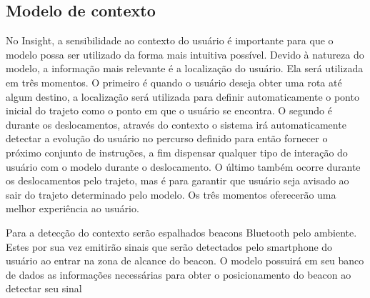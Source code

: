 \documentclass[english,brazilian]{UNISINOSmonografia}
\begin{document}

\subsection{Modelo de contexto}
No Insight, a sensibilidade ao contexto do usuário é importante para que o modelo possa ser utilizado da forma mais intuitiva possível. Devido à natureza do modelo, a informação mais relevante é a localização do usuário. Ela será utilizada em três momentos. O primeiro é quando o usuário deseja obter uma rota até algum destino, a localização será utilizada para definir automaticamente o ponto inicial do trajeto como o ponto em que o usuário se encontra. O segundo é durante os deslocamentos, através do contexto o sistema irá automaticamente detectar a evolução do usuário no percurso definido para então fornecer o próximo conjunto de instruções, a fim dispensar qualquer tipo de interação do usuário com o modelo durante o deslocamento. O último também ocorre durante os deslocamentos pelo trajeto, mas é para garantir que usuário seja avisado ao sair do trajeto determinado pelo modelo. Os três momentos oferecerão uma melhor experiência ao usuário.

Para a detecção do contexto serão espalhados beacons Bluetooth pelo ambiente. Estes por sua vez emitirão sinais que serão detectados pelo smartphone do usuário ao entrar na zona de alcance do beacon. O modelo possuirá em seu banco de dados as informações necessárias para obter o posicionamento do beacon ao detectar seu sinal
\end{document}
